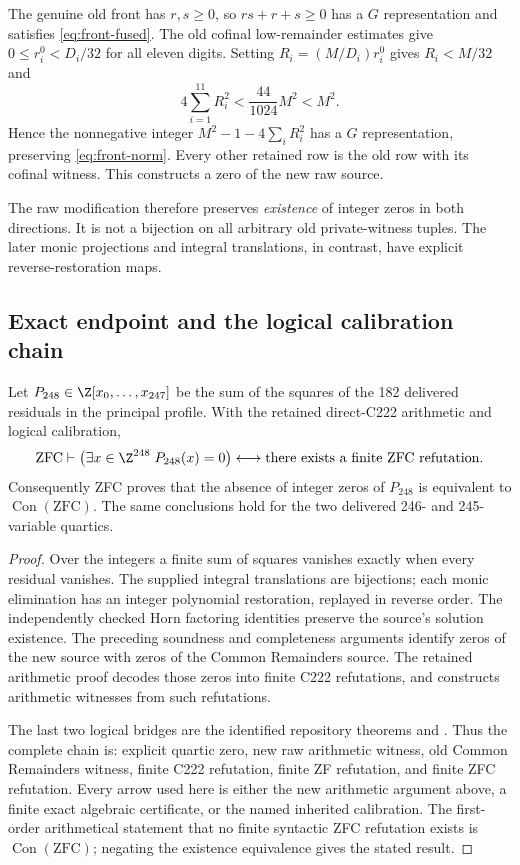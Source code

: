 The genuine old front has $r,s\geq0$, so $rs+r+s\geq0$ has a
$G$ representation and satisfies \eqref{eq:front-fused}.  The old
cofinal low-remainder estimates give $0\leq r_i^0<D_i/32$ for all
eleven digits.  Setting $R_i=(M/D_i)r_i^0$ gives $R_i<M/32$ and
\[
 4\sum_{i=1}^{11}R_i^2
 <\frac{44}{1024}M^2<M^2.
\]
Hence the nonnegative integer
$M^2-1-4\sum_iR_i^2$ has a $G$ representation, preserving
\eqref{eq:front-norm}.  Every other retained row is the old row with
its cofinal witness.  This constructs a zero of the new raw source.

The raw modification therefore preserves \emph{existence} of integer
zeros in both directions.  It is not a bijection on all arbitrary old
private-witness tuples.  The later monic projections and integral
translations, in contrast, have explicit reverse-restoration maps.

\subsection{Exact endpoint and the logical calibration chain}

\begin{theorem}
\label{thm:direct248}
Let $P_{248}\in\Z[x_0,\ldots,x_{247}]$ be the sum of the squares of
the 182 delivered residuals in the principal profile.  With the
retained direct-C222 arithmetic and logical calibration,
\[
 \mathrm{ZFC}\vdash
 \left(\exists x\in\Z^{248}\;P_{248}(x)=0\right)
 \longleftrightarrow
 \text{there exists a finite ZFC refutation}.
\]
Consequently ZFC proves that the absence of integer zeros of $P_{248}$
is equivalent to $\operatorname{Con}(\mathrm{ZFC})$.
The same conclusions hold for the two delivered 246- and 245-variable
quartics.
\end{theorem}
\begin{proof}
Over the integers a finite sum of squares vanishes exactly when every
residual vanishes.  The supplied integral translations are bijections;
each monic elimination has an integer polynomial restoration, replayed
in reverse order.  The independently checked Horn factoring identities
preserve the source's solution existence.  The preceding soundness and
completeness arguments identify zeros of the new source with zeros of
the Common Remainders source.  The retained arithmetic proof decodes
those zeros into finite C222 refutations, and constructs arithmetic
witnesses from such refutations.

The last two logical bridges are the identified repository theorems
 and
.
Thus the complete chain is: explicit quartic zero, new raw arithmetic
witness, old Common Remainders witness, finite C222 refutation, finite
ZF refutation, and finite ZFC refutation.  Every arrow used here is
either the new arithmetic argument above, a finite exact algebraic
certificate, or the named inherited calibration.  The first-order
arithmetical statement that no finite syntactic ZFC refutation exists
is $\operatorname{Con}(\mathrm{ZFC})$; negating the existence
equivalence gives the stated result.
\end{proof}

